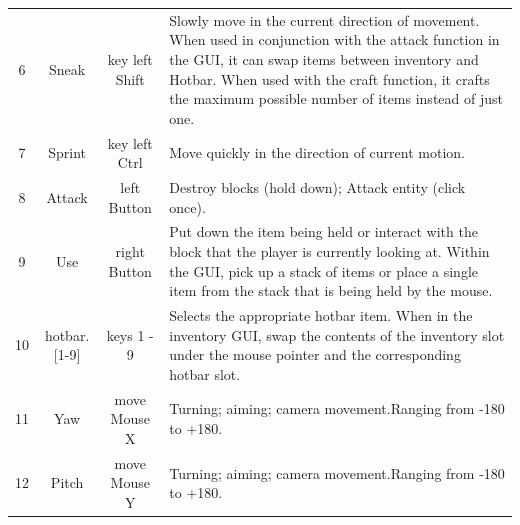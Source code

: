 \documentclass[11pt, a4paper, logo, one column]{craftjarvis}
\begin{document}
\begin{table}[]
{\begin{tabularx}{\linewidth}{cccY}
6              & Sneak            & key left Shift        & Slowly move in the current direction of movement. When used in conjunction with the attack function in the GUI, it can swap items between inventory and Hotbar. When used with the craft function, it crafts the maximum possible number of items instead of just one. \\
7              & Sprint           & key left Ctrl         & Move quickly in the direction of current motion.                                                                                                                                                                                                                                                                 \\
8              & Attack           & left Button     & Destroy blocks (hold down); Attack entity (click once).                                                                                                                                                                                                                                                          \\
9              & Use              & right Button    & Put down the item being held or interact with the block that the player is currently looking at. Within the GUI, pick up a stack of items or place a single item from the stack that is being held by the mouse.                                                                                                 \\
10             & hotbar.{[}1-9{]} & keys 1 - 9            & Selects the appropriate hotbar item. When in the inventory GUI, swap the contents of the inventory slot under the mouse pointer and the corresponding hotbar slot.                                                                                                                                               \\
11             & Yaw              & move Mouse X      & Turning; aiming; camera movement.Ranging from -180 to +180.                                                                                                                                                                                                                                                      \\
12             & Pitch            & move Mouse Y      & Turning; aiming; camera movement.Ranging from -180 to +180.                                                                                                                                                                                                                                                      \\ \bottomrule
\end{tabularx}
}
\end{table}
\end{document}
